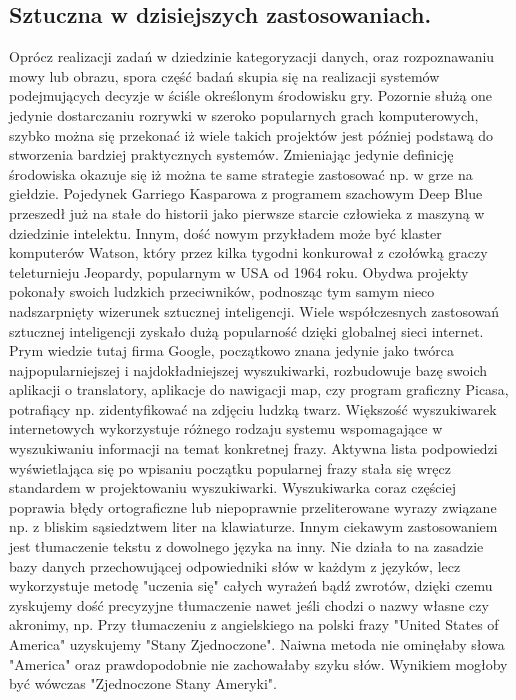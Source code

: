 \subsection{Sztuczna w dzisiejszych zastosowaniach.}
\begin{par}
Oprócz realizacji zadań w dziedzinie kategoryzacji danych, oraz rozpoznawaniu mowy lub obrazu, spora część badań skupia się na realizacji systemów podejmujących decyzje w ściśle określonym środowisku gry.
Pozornie służą one jedynie dostarczaniu rozrywki w szeroko popularnych grach komputerowych, szybko można się przekonać iż wiele takich projektów jest później podstawą do stworzenia bardziej praktycznych systemów. Zmieniając jedynie definicję środowiska okazuje się iż można te same strategie zastosować np. w grze na giełdzie.
Pojedynek Garriego Kasparowa z programem szachowym Deep Blue przeszedł już na stałe do historii jako pierwsze starcie człowieka z maszyną w dziedzinie intelektu. 
Innym, dość nowym przykładem może być klaster komputerów Watson, który przez kilka tygodni konkurował z czołówką graczy teleturnieju Jeopardy, popularnym w USA od 1964 roku.
Obydwa projekty pokonały swoich ludzkich przeciwników, podnosząc tym samym nieco nadszarpnięty wizerunek sztucznej inteligencji.
Wiele współczesnych zastosowań sztucznej inteligencji zyskało dużą popularność dzięki globalnej sieci internet.
Prym wiedzie tutaj firma Google, początkowo znana jedynie jako twórca najpopularniejszej i najdokładniejszej wyszukiwarki, rozbudowuje bazę swoich aplikacji o translatory,
aplikacje do nawigacji map, czy program graficzny Picasa, potrafiący np. zidentyfikować na zdjęciu ludzką twarz.
Większość wyszukiwarek internetowych wykorzystuje różnego rodzaju systemu wspomagające w wyszukiwaniu informacji na temat konkretnej frazy.
Aktywna lista podpowiedzi wyświetlająca się po wpisaniu początku popularnej frazy stała się wręcz standardem w projektowaniu wyszukiwarki.
Wyszukiwarka coraz częściej poprawia błędy ortograficzne lub niepoprawnie przeliterowane wyrazy związane np. z bliskim sąsiedztwem liter na klawiaturze.
Innym ciekawym zastosowaniem jest tłumaczenie tekstu z dowolnego języka na inny.
Nie działa to na zasadzie bazy danych przechowującej odpowiedniki słów w każdym z języków, lecz wykorzystuje metodę "uczenia się" całych wyrażeń bądź zwrotów, 
dzięki czemu zyskujemy dość precyzyjne tłumaczenie nawet jeśli chodzi o nazwy własne czy akronimy, np. Przy tłumaczeniu z angielskiego na polski frazy "United States of America" uzyskujemy "Stany Zjednoczone".
Naiwna metoda nie ominęłaby słowa "America" oraz prawdopodobnie nie zachowałaby szyku słów. Wynikiem mogłoby być wówczas "Zjednoczone Stany Ameryki".

\end{par}
